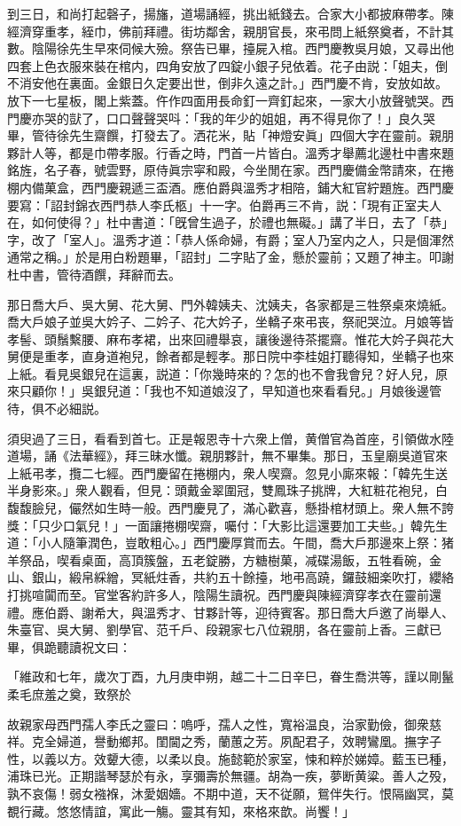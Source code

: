 到三日，和尚打起磬子，揚旛，道場誦經，挑出紙錢去。合家大小都披麻帶孝。陳經濟穿重孝，絰巾，佛前拜禮。街坊鄰舍，親朋官長，來弔問上紙祭奠者，不計其數。陰陽徐先生早來伺候大殮。祭告已畢，擡屍入棺。西門慶教吳月娘，又尋出他四套上色衣服來裝在棺内，四角安放了四錠小銀子兒依着。花子由説：「姐夫，倒不消安他在裏面。金銀日久定要出世，倒非久遠之計。」西門慶不肯，安放如故。放下一七星板，閣上紫蓋。仵作四面用長命釘一齊釘起來，一家大小放聲號哭。西門慶亦哭的獃了，口口聲聲哭呌：「我的年少的姐姐，再不得見你了！」良久哭畢，管待徐先生齋饌，打發去了。洒花米，貼「神燈安眞」四個大字在靈前。親朋夥計人等，都是巾帶孝服。行香之時，門首一片皆白。溫秀才舉薦北邊杜中書來題銘旌，名子春，號雲野，原侍眞宗寜和殿，今坐閒在家。西門慶備金幣請來，在捲棚内備菓盒，西門慶親遞三盃酒。應伯爵與溫秀才相陪，鋪大紅官紵題旌。西門慶要寫：「詔封錦衣西門恭人李氏柩」十一字。伯爵再三不肯，説：「現有正室夫人在，如何使得？」杜中書道：「旣曾生過子，於禮也無礙。」講了半日，去了「恭」字，改了「室人」。溫秀才道：「恭人係命婦，有爵；室人乃室内之人，只是個渾然通常之稱。」於是用白粉題畢，「詔封」二字貼了金，懸於靈前；又題了神主。叩謝杜中書，管待酒饌，拜辭而去。

那日喬大戶、吳大舅、花大舅、門外韓姨夫、沈姨夫，各家都是三牲祭桌來燒紙。喬大戶娘子並吳大妗子、二妗子、花大妗子，坐轎子來弔丧，祭祀哭泣。月娘等皆孝髻、頭鬚繫腰、麻布孝裙，出來回禮舉哀，讓後邊待茶擺齋。惟花大妗子與花大舅便是重孝，直身道袍兒，餘者都是輕孝。那日院中李桂姐打聽得知，坐轎子也來上紙。看見吳銀兒在這裏，説道：「你幾時來的？怎的也不會我會兒？好人兒，原來只顧你！」吳銀兒道：「我也不知道娘沒了，早知道也來看看兒。」月娘後邊管待，俱不必細説。

須臾過了三日，看看到首七。正是報恩寺十六衆上僧，黄僧官為首座，引領做水陸道場，誦《法華經》，拜三昧水懺。親朋夥計，無不畢集。那日，玉皇廟吳道官來上紙弔孝，攬二七經。西門慶留在捲棚内，衆人喫齋。忽見小廝來報：「韓先生送半身影來。」衆人觀看，但見：頭戴金翠圍冠，雙鳳珠子挑牌，大紅粧花袍兒，白馥馥臉兒，儼然如生時一般。西門慶見了，滿心歡喜，懸掛棺材頭上。衆人無不誇獎：「只少口氣兒！」一面讓捲棚喫齋，囑付：「大影比這還要加工夫些。」韓先生道：「小人隨筆潤色，豈敢粗心。」西門慶厚賞而去。午間，喬大戶那邊來上祭：猪羊祭品，喫看桌面，高頂簇盤，五老錠勝，方糖樹菓，减碟湯飯，五牲看碗，金山、銀山，緞帛綵繒，冥紙炷香，共約五十餘擡，地弔高蹺，鑼鼓細楽吹打，纓絡打挑喧闐而至。官堂客約許多人，陰陽生讀祝。西門慶與陳經濟穿孝衣在靈前還禮。應伯爵、謝希大，與溫秀才、甘夥計等，迎待賓客。那日喬大戶邀了尚舉人、朱臺官、吳大舅、劉學官、范千戶、段親家七八位親朋，各在靈前上香。三獻已畢，俱跪聽讀祝文曰：

\begin{myquote}
「維政和七年，歲次丁酉，九月庚申朔，越二十二日辛巳，眷生喬洪等，謹以剛鬣柔毛庶羞之奠，致祭於

故親家母西門孺人李氏之靈曰：嗚呼，孺人之性，寬裕温良，治家勤儉，御衆慈祥。克全婦道，譽動鄉邦。閨閫之秀，蘭蕙之芳。夙配君子，效聘鸞凰。撫字子性，以義以方。效顰大德，以柔以良。施懿範於家室，悚和粹於娣嫜。藍玉已種，浦珠已光。正期諧琴瑟於有永，享彌壽於無疆。胡為一疾，夢断黄粱。善人之殁，孰不哀傷！弱女襁褓，沐愛姻嬙。不期中道，天不従願，鴛伴失行。恨隔幽冥，莫覩行藏。悠悠情誼，寓此一觴。靈其有知，來格來歆。尚饗！」
\end{myquote}

